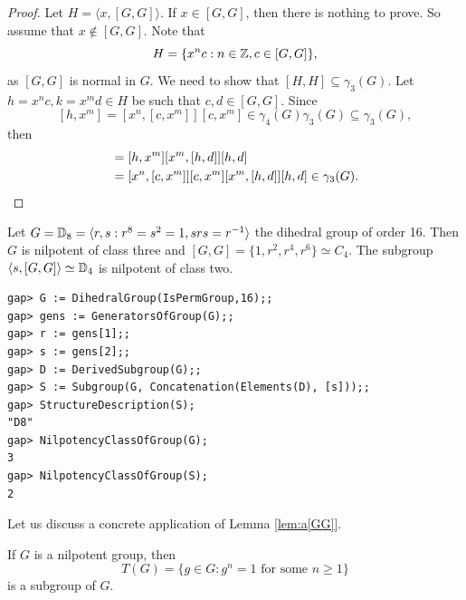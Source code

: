 \begin{proof}
Let $H=\langle x,[G,G]\rangle$.  If $x\in [G,G]$, then there is nothing to prove. 
So assume that $x\not\in [G,G]$. Note that 
	\[
		H=\{x^nc:n\in\mathbb{Z},c\in [G,G]\},
	\]
as $[G,G]$ is normal in $G$. We need to show that
$[H,H]\subseteq\gamma_3(G)$. Let $h=x^nc,k=x^md\in H$
be such that $c,d\in [G,G]$. 
Since 
	\[
	[h,x^m]=[x^n,[c,x^m]][c,x^m]\in\gamma_4(G)\gamma_3(G)\subseteq\gamma_3(G),
	\]
then  
	\begin{align*}
		[h,k]&=[h,x^m][x^m,[h,d]][h,d]\\
			&=[x^n,[c,x^m]][c,x^m][x^m,[h,d]][h,d]\in\gamma_3(G).\qedhere
	\end{align*}
\end{proof}

\begin{example}
Let $G=\mathbb{D}_{8}=\langle r,s:r^{8}=s^2=1,srs=r^{-1}\rangle$ the dihedral group of order 16.
Then $G$ is nilpotent of class three and 
$[G,G]=\{1,r^2,r^4,r^6\}\simeq C_4$. The subgroup $\langle
s,[G,G]\rangle\simeq\mathbb{D}_4$ is nilpotent of class two. 
\begin{lstlisting}
gap> G := DihedralGroup(IsPermGroup,16);;
gap> gens := GeneratorsOfGroup(G);;
gap> r := gens[1];;
gap> s := gens[2];;
gap> D := DerivedSubgroup(G);;
gap> S := Subgroup(G, Concatenation(Elements(D), [s]));;
gap> StructureDescription(S);
"D8"
gap> NilpotencyClassOfGroup(G);
3
gap> NilpotencyClassOfGroup(S);
2
	\end{lstlisting}
\end{example}

Let us discuss a concrete application of Lemma \ref{lem:a[GG]}.

\begin{theorem}
\label{thm:T(nilpotent)}
If $G$ is a nilpotent group, then 
\[
T(G)=\{g\in G:g^n=1\text{ for some $n\geq1$}\}
\]
is a subgroup of $G$. 
\end{theorem}

